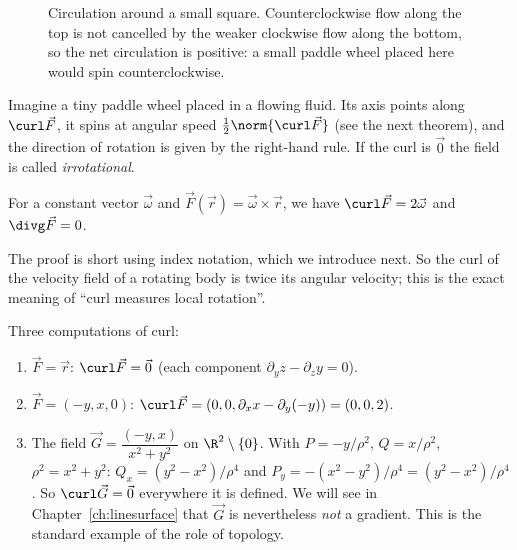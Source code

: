 \begin{figure}[ht]
\centering
{}
\caption{Circulation around a small square. Counterclockwise flow along the top is not cancelled by the weaker clockwise flow along the bottom, so the net circulation is positive: a small paddle wheel placed here would spin counterclockwise.}
\label{fig:curlbox}
\end{figure}

\begin{intuition}
Imagine a tiny paddle wheel placed in a flowing fluid. Its axis points along $\curl\vec F$, it spins at angular speed $\tfrac12\norm{\curl\vec F}$ (see the next theorem), and the direction of rotation is given by the right-hand rule. If the curl is $\vec0$ the field is called \emph{irrotational}.
\end{intuition}

\begin{theorem}\label{thm:rigid}
For a constant vector $\vec\omega$ and $\vec F(\vec r)=\vec\omega\times\vec r$, we have $\curl\vec F=2\vec\omega$ and $\divg\vec F=0$.
\end{theorem}

The proof is short using index notation, which we introduce next. So the curl of the velocity field of a rotating body is twice its angular velocity; this is the exact meaning of ``curl measures local rotation''.

\begin{example}
Three computations of curl:
\begin{enumerate}[label=(\alph*)]
  \item $\vec F=\vec r$: $\curl\vec F=\vec 0$ (each component $\partial_yz-\partial_zy=0$).
  \item $\vec F=(-y,x,0)$: $\curl\vec F=(0,0,\partial_x x-\partial_y(-y))=(0,0,2)$.
  \item The field $\vec G=\dfrac{(-y,x)}{x^2+y^2}$ on $\R^2\setminus\{0\}$. With $P=-y/\rho^2$, $Q=x/\rho^2$, $\rho^2=x^2+y^2$: $Q_x=(y^2-x^2)/\rho^4$ and $P_y=-(x^2-y^2)/\rho^4=(y^2-x^2)/\rho^4$. So $\curl\vec G=\vec 0$ everywhere it is defined. We will see in Chapter~\ref{ch:linesurface} that $\vec G$ is nevertheless \emph{not} a gradient. This is the standard example of the role of topology.
\end{enumerate}
\end{example}

